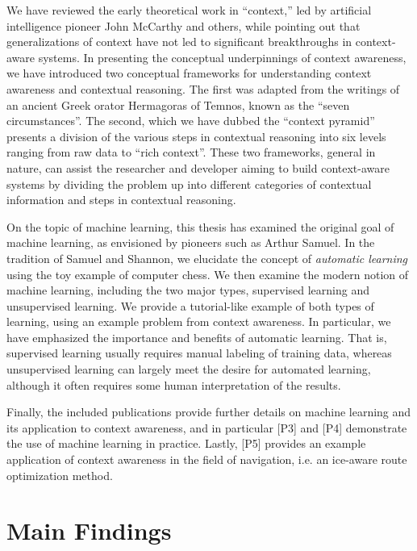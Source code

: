 We have reviewed the early theoretical work in ``context,'' led by artificial intelligence pioneer John McCarthy and others, while pointing out that generalizations of context have not led to significant breakthroughs in context-aware systems. In presenting the conceptual underpinnings of context awareness, we have introduced two conceptual frameworks for understanding context awareness and contextual reasoning. The first was adapted from the writings of an ancient Greek orator Hermagoras of Temnos, known as the ``seven circumstances''. The second, which we have dubbed the ``context pyramid'' presents a division of the various steps in contextual reasoning into six levels ranging from raw data to ``rich context''. These two frameworks, general in nature, can assist the researcher and developer aiming to build context-aware systems by dividing the problem up into different categories of contextual information and steps in contextual reasoning.

On the topic of machine learning, this thesis has examined the original goal of machine learning, as envisioned by pioneers such as Arthur Samuel. In the tradition of Samuel and Shannon, we elucidate the concept of \emph{automatic learning} using the toy example of computer chess. We then examine the modern notion of machine learning, including the two major types, supervised learning and unsupervised learning. We provide a tutorial-like example of both types of learning, using an example problem from context awareness. In particular, we have emphasized the importance and benefits of automatic learning. That is, supervised learning usually requires manual labeling of training data, whereas unsupervised learning can largely meet the desire for automated learning, although it often requires some human interpretation of the results. 

Finally, the included publications provide further details on machine learning and its application to context awareness, and in particular [P3] and [P4] demonstrate the use of machine learning in practice. Lastly, [P5] provides an example application of context awareness in the field of navigation, i.e. an ice-aware route optimization method.

\section{Main Findings}
\label{sec:main_findings}

